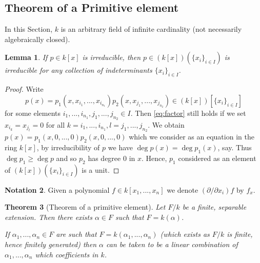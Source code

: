 \documentclass[12pt]{article}
\theoremstyle{plain}
\newtheorem{thm}{Theorem}[subsection] %
\newtheorem{lemma}[thm]{Lemma}
\theoremstyle{definition}
\newtheorem{notation}[thm]{Notation}
\begin{document}
\subsection{Theorem of a Primitive element}
In this Section, $k$ is an arbitrary field of infinite cardinality (not necessarily algebraically closed).
\begin{lemma}
\label{lem:irred_in_ext}
If $p \in k[x]$ is irreducible, then $p \in (k[x])(\lbrace x_i\rbrace_{i \in I})$ is irreducible for any collection of indeterminants $\lbrace x_i \rbrace_{i \in I}$.
\end{lemma}
\begin{proof}
Write
\begin{equation}\label{eq:factor}
p(x) = p_1(x,x_{i_1},...,x_{i_{n_1}})p_2(x,x_{j_1},...,x_{j_{{n_2}}}) \in (k[x])[\lbrace x_i\rbrace_{i \in I}]    
\end{equation}
for some elements $i_{1},...,i_{n_1},j_1,...,j_{n_2} \in I$. Then \eqref{eq:factor} still holds if we set $x_{i_k} = x_{j_l} = 0$ for all $k= i_1,...,i_{n_1}, l = j_1,...,j_{n_2}$. We obtain $p(x) = p_1(x,0,...,0)p_2(x,0,...,0)$ which we consider as an equation in the ring $k[x]$, by irreducibility of $p$ we have $\operatorname{deg}p(x) = \operatorname{deg}p_1(x)$, say. Thus $\operatorname{deg}p_1 \geq \operatorname{deg}p$ and so $p_2$ has degree $0$ in $x$. Hence, $p_1$ considered as an element of $(k[x])(\lbrace x_i\rbrace_{i \in I})$ is a unit.
\end{proof}
\begin{notation}
Given a polynomial $f \in k[x_1,...,x_n]$ we denote $(\partial/\partial x_i)f$ by $f_{x}$.
\end{notation}
\begin{thm}[Theorem of a primitive element]
\label{thm:primitive_element}
Let $F/k$ be a finite, separable extension. Then there exists $\alpha \in F$ such that $F = k(\alpha)$.

If $\alpha_1,...,\alpha_n \in F$ are such that $F = k(\alpha_1,...,\alpha_n)$ (which exists as $F/k$ is finite, hence finitely generated) then $\alpha$ can be taken to be a linear combination of $\alpha_1,...,\alpha_n$ which coefficients in $k$.
\end{thm}
\end{document}
